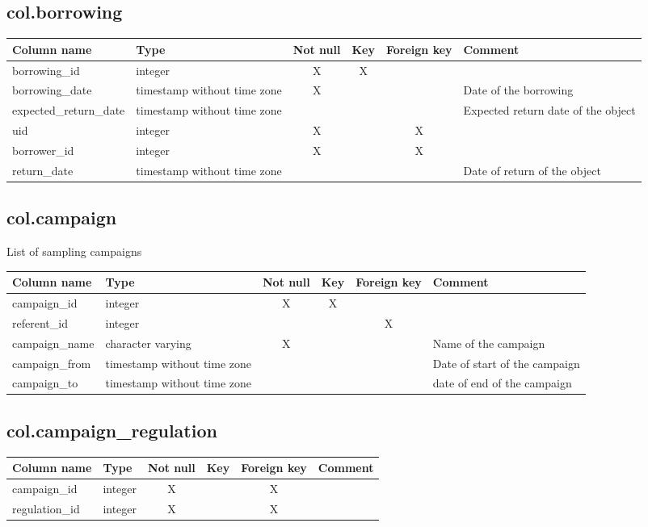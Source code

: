 \subsection{col.borrowing}


\begin{tabular}{|l| p{2cm}|c|c|c| p{3cm}|}
\hline
Column name & Type & Not null & Key & Foreign key & Comment \\
\hline
borrowing\_id & integer & X & X & & \\
\hline
borrowing\_date & timestamp without time zone & X & & & Date of the borrowing\\
\hline
expected\_return\_date & timestamp without time zone & & & & Expected return date of the object\\
\hline
uid & integer & X & & X & \\
\hline
borrower\_id & integer & X & & X & \\
\hline
return\_date & timestamp without time zone & & & & Date of return of the object\\
\hline
\end{tabular}
\subsection{col.campaign}
List of sampling campaigns

\begin{tabular}{|l| p{2cm}|c|c|c| p{3cm}|}
\hline
Column name & Type & Not null & Key & Foreign key & Comment \\
\hline
campaign\_id & integer & X & X & & \\
\hline
referent\_id & integer & & & X & \\
\hline
campaign\_name & character varying & X & & & Name of the campaign\\
\hline
campaign\_from & timestamp without time zone & & & & Date of start of the campaign\\
\hline
campaign\_to & timestamp without time zone & & & & date of end of the campaign\\
\hline
\end{tabular}
\subsection{col.campaign\_regulation}


\begin{tabular}{|l| p{2cm}|c|c|c| p{3cm}|}
\hline
Column name & Type & Not null & Key & Foreign key & Comment \\
\hline
campaign\_id & integer & X & & X & \\
\hline
regulation\_id & integer & X & & X & \\
\hline
\end{tabular}

